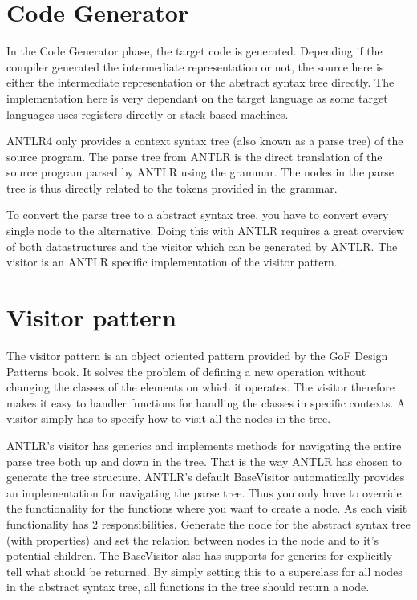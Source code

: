 \section{Code Generator}
In the Code Generator phase, the target code is generated. Depending if the compiler generated the intermediate representation or not, the source here is either the intermediate representation or the abstract syntax tree directly. The implementation here is very dependant on the target language as some target languages uses registers directly or stack based machines.

ANTLR4 only provides a context syntax tree (also known as a parse tree) of the source program. The parse tree from ANTLR is the direct translation of the source program parsed by ANTLR using the grammar. The nodes in the parse tree is thus directly related to the tokens provided in the grammar.

To convert the parse tree to a abstract syntax tree, you have to convert every single node to the alternative.
Doing this with ANTLR requires a great overview of both datastructures and the visitor which can be generated by ANTLR. The visitor is an ANTLR specific implementation of the visitor pattern.

\section{Visitor pattern}
The visitor pattern is an object oriented pattern provided by the GoF Design Patterns book.
It solves the problem of defining a new operation without changing the classes of the elements on which it operates.
The visitor therefore makes it easy to handler functions for handling the classes in specific contexts. A visitor simply has to specify how to visit all the nodes in the tree.

ANTLR's visitor has generics and implements methods for navigating the entire parse tree both up and down in the tree. That is the way ANTLR has chosen to generate the tree structure.
ANTLR's default BaseVisitor automatically provides an implementation for navigating the parse tree. Thus you only have to override the functionality for the functions where you want to create a node.
As each visit functionality has 2 responsibilities. Generate the node for the abstract syntax tree (with properties) and set the relation between nodes in the node and to it's potential children.
The BaseVisitor also has supports for generics for explicitly tell what should be returned. By simply setting this to a superclass for all nodes in the abstract syntax tree, all functions in the tree should return a node. 

